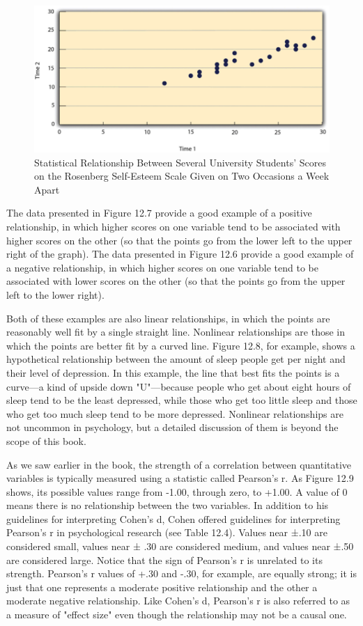 \begin{figure}

\includegraphics[width=.7\linewidth]{figures/Fig12-7}

\caption{ Statistical Relationship Between Several University Students' Scores on the Rosenberg Self-Esteem Scale Given on Two Occasions a Week Apart}

\label{fig:retest}

\end{figure}


The data presented in Figure 12.7 provide a good example of a positive relationship, in which higher scores on one variable tend to be associated with higher scores on the other (so that the points go from the lower left to the upper right of the graph). The data presented in Figure 12.6 provide a good example of a negative relationship, in which higher scores on one variable tend to be associated with lower scores on the other (so that the points go from the upper left to the lower right).

Both of these examples are also linear relationships, in which the points are reasonably well fit by a single straight line. Nonlinear relationships are those in which the points are better fit by a curved line. Figure 12.8, for example, shows a hypothetical relationship between the amount of sleep people get per night and their level of depression. In this example, the line that best fits the points is a curve---a kind of upside down "U"---because people who get about eight hours of sleep tend to be the least depressed, while those who get too little sleep and those who get too much sleep tend to be more depressed. Nonlinear relationships are not uncommon in psychology, but a detailed discussion of them is beyond the scope of this book.

As we saw earlier in the book, the strength of a correlation between quantitative variables is typically measured using a statistic called Pearson's r. As Figure 12.9 shows, its possible values range from -1.00, through zero, to +1.00. A value of 0 means there is no relationship between the two variables. In addition to his guidelines for interpreting Cohen's d, Cohen offered guidelines for interpreting Pearson's r in psychological research (see Table 12.4). Values near ±.10 are considered small, values near ± .30 are considered medium, and values near ±.50 are considered large. Notice that the sign of Pearson's r is unrelated to its strength. Pearson's r values of +.30 and -.30, for example, are equally strong; it is just that one represents a moderate positive relationship and the other a moderate negative relationship. Like Cohen's d, Pearson's r is also referred to as a measure of "effect size" even though the relationship may not be a causal one.

